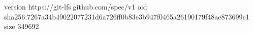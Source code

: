 version https://git-lfs.github.com/spec/v1
oid sha256:7267a34b49022077231d6a726ff0b83e3b947f0465a26190179f48ae873699c1
size 349692
